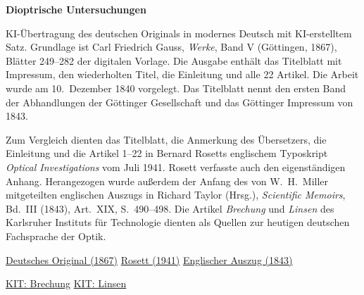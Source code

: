 \clearpage
\thispagestyle{empty}
\begin{center}\Large\textbf{Dioptrische Untersuchungen}\end{center}

KI-Übertragung des deutschen Originals in modernes Deutsch mit KI-erstelltem Satz. Grundlage ist Carl Friedrich Gauss, \textit{Werke}, Band V (Göttingen, 1867), Blätter 249--282 der digitalen Vorlage. Die Ausgabe enthält das Titelblatt mit Impressum, den wiederholten Titel, die Einleitung und alle 22 Artikel. Die Arbeit wurde am 10.~Dezember 1840 vorgelegt. Das Titelblatt nennt den ersten Band der Abhandlungen der Göttinger Gesellschaft und das Göttinger Impressum von 1843.

Zum Vergleich dienten das Titelblatt, die Anmerkung des Übersetzers, die Einleitung und die Artikel 1--22 in Bernard Rosetts englischem Typoskript \textit{Optical Investigations} vom Juli 1941. Rosett verfasste auch den eigenständigen Anhang. Herangezogen wurde außerdem der Anfang des von W.~H.~Miller mitgeteilten englischen Auszugs in Richard Taylor (Hrsg.), \textit{Scientific Memoirs}, Bd.~III (1843), Art.~XIX, S.~490--498. Die Artikel \textit{Brechung} und \textit{Linsen} des Karlsruher Instituts für Technologie dienten als Quellen zur heutigen deutschen Fachsprache der Optik.

\noindent\href{https://gdz.sub.uni-goettingen.de/id/PPN236006339}{Deutsches Original (1867)}\quad
\href{https://wp.optics.arizona.edu/jsasian/wp-content/uploads/sites/33/2016/02/Gauss.pdf}{Rosett (1941)}\quad
\href{https://archive.org/details/scientificmemoir03memo/page/490/mode/1up}{Englischer Auszug (1843)}\quad
\par\smallskip\noindent\href{https://labs.physik.kit.edu/prakt-klass-physik-manuals/P1/Geometrische_Optik/doc/Hinweise-Brechung/}{KIT: Brechung}\quad
\href{https://labs.physik.kit.edu/prakt-klass-physik-manuals/P1/Geometrische_Optik/doc/Hinweise-Linsen/}{KIT: Linsen}
\clearpage
